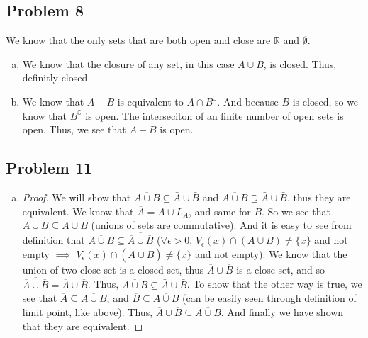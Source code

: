 \documentclass[12pt]{article}
\begin{document}
\subsection*{Problem 8}
We know that the only sets that are both open and close are $\mathbb{R}$ and $\emptyset$. 

\begin{enumerate}[a).]
    \item {
        We know that the closure of any set, in this case $ A \cup B$, is closed. 
        Thus, definitly closed
    }

    \item {
        We know that $A - B$ is equivalent to $A \cap B^\complement$.
        And because $B$ is closed, so we know that $B^\complement$ is open. 
        The interseciton of an finite number of open sets is open. 
        Thus, we see that $A - B$ is open. 
    }
\end{enumerate}

\subsection*{Problem 11}
\begin{enumerate}[a).]
    \item {
        \begin{proof}
            We will show that $\overline{A \cup B} \subseteq \bar{A} \cup \bar{B}$ and $\overline{A \cup B} \supseteq \bar{A} \cup \bar{B}$, thus they are equivalent. 
            We know that $\overline{A} = A \cup L_A$, and same for $B$. 
            So we see that $A \cup B \subseteq \overline{A} \cup \overline{B}$ (unions of sets are commutative). 
            And it is easy to see from definition that $\overline{A \cup B} \subseteq \overline{\overline{A} \cup \overline{B}}$ ($\forall \epsilon > 0$, $V_{\epsilon}(x) \cap (A \cup B) \ne \{x\}$ and not empty $\implies$ $V_{\epsilon}(x) \cap (\overline{A} \cup \overline{B}) \ne \{x\}$ and not empty). 
            We know that the union of two close set is a closed set, thus $\overline{A} \cup \overline{B}$ is a close set, and so $\overline{\overline{A} \cup \overline{B}} = \overline{A} \cup \overline{B}$.
            Thus, $\overline{A \cup B} \subseteq \bar{A} \cup \bar{B}$. 
            To show that the other way is true, we see that $\overline{A} \subseteq \overline{A \cup B}$, and $\overline{B} \subseteq \overline{A \cup B}$ (can be easily seen through definition of limit point, like above).
            Thus, $\overline{A} \cup \overline{B} \subseteq \overline{A \cup B}$.  
            And finally we have shown that they are equivalent. 
            
        \end{proof}
    }
\end{enumerate}
\end{document}
